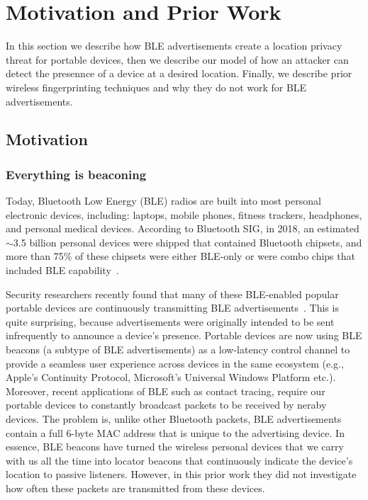\section{Motivation and Prior Work}

\label{sec:motivation}

In this section we describe how BLE advertisements create a location privacy
threat for portable devices, then we describe our model of how an attacker can
detect the presennce of a device at a desired location. Finally, we describe prior
wireless fingerprinting techniques and why they do not work for BLE
advertisements.

\subsection{Motivation}

\subsubsection*{Everything is beaconing}


Today, Bluetooth Low Energy (BLE) radios are built into most personal
electronic devices, including: laptops, mobile phones, fitness trackers,
headphones, and personal medical devices. 
%
According to Bluetooth SIG, in 2018, an estimated $\sim$3.5 billion personal
devices were shipped that contained Bluetooth chipsets, and more than 75\% of
these chipsets were either BLE-only or were combo chips that included BLE
capability~\cite{BTSIG_shipped_2019}.

Security researchers recently found that many of these BLE-enabled popular
portable devices are continuously transmitting BLE
advertisements~\cite{Iphonetracking_becker,MACRandomizationfail_Martin}. 
%
This is quite surprising, because advertisements were originally intended to be
sent infrequently to announce a device's presence.
%
Portable devices are now using BLE beacons (a subtype of BLE advertisements)
as a low-latency control channel to provide a seamless user experience across
devices in the same ecosystem (e.g., Apple's Continuity Protocol, Microsoft's
Universal Windows Platform etc.). Moreover, recent applications of BLE such as contact tracing, require our portable devices to constantly broadcast packets to be received by neraby devices.
%
The problem is, unlike other Bluetooth packets, BLE advertisements contain a
full 6-byte MAC address that is unique to the advertising device.
%
In essence, BLE beacons have turned the wireless personal devices that we carry
with us all the time into locator beacons that continuously indicate the
device's location to passive listeners.
%
However, in this prior work they did not investigate how often these packets
are transmitted from these devices.

